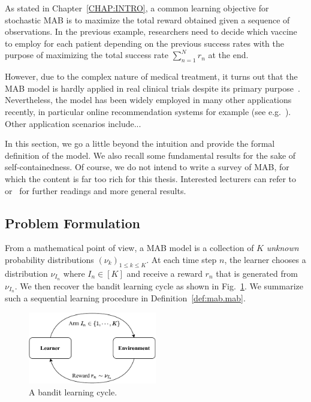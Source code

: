As stated in Chapter~\ref{CHAP:INTRO}, a common learning objective for stochastic MAB is to maximize the total reward obtained given a sequence of observations. In the previous example, researchers need to decide which vaccine to employ for each patient depending on the previous success rates with the purpose of maximizing the total success rate $\sum_{n=1}^N r_n$ at the end.

However, due to the complex nature of medical treatment, it turns out that the MAB model is hardly applied in real clinical trials despite its primary purpose~\citep{reda2020drug}. Nevertheless, the model has been widely employed in many other applications recently, in particular online recommendation systems for example (see e.g.~\citealt{li2010contextual,zeng2016online}). Other application scenarios include...

In this section, we go a little beyond the intuition and provide the formal definition of the model. We also recall some fundamental results for the sake of self-containedness. Of course, we do not intend to write a survey of MAB, for which the content is far too rich for this thesis. Interested lecturers can refer to~\cite{bubeck2012bandits,lattimore2018bandits} or~\cite{slivkins2019bandits} for further readings and more general results.

\subsection{Problem Formulation}\label{sec:mab.model.formulation}

From a mathematical point of view, a MAB model is a collection of $K$ \emph{unknown} probability distributions $(\nu_k)_{1 \leq k \leq K}$. At each time step $n$, the learner chooses a distribution $\nu_{I_n}$ where $I_n\in[K]$ and receive a reward $r_n$ that is generated from $\nu_{I_n}$. We then recover the bandit learning cycle as shown in Fig.~\ref{fig:mab.mab}. We summarize such a sequential learning procedure in Definition~\ref{def:mab.mab}.

\begin{figure}[ht]
    \centering
    \includegraphics[width=0.5\textwidth]{Chapter2/img/mab_bis.pdf}
    \caption{A bandit learning cycle.}
    \label{fig:mab.mab}
\end{figure}

